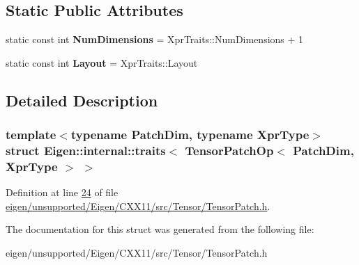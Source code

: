 \subsection*{Static Public Attributes}
\begin{DoxyCompactItemize}
\item 
\mbox{\label{struct_eigen_1_1internal_1_1traits_3_01_tensor_patch_op_3_01_patch_dim_00_01_xpr_type_01_4_01_4_a271eeecc752081f39f0ac5aaec71452e}} 
static const int {\bfseries Num\+Dimensions} = Xpr\+Traits\+::\+Num\+Dimensions + 1
\item 
\mbox{\label{struct_eigen_1_1internal_1_1traits_3_01_tensor_patch_op_3_01_patch_dim_00_01_xpr_type_01_4_01_4_ad5979fe3bd472b1ab35aa66724ec6a7a}} 
static const int {\bfseries Layout} = Xpr\+Traits\+::\+Layout
\end{DoxyCompactItemize}


\subsection{Detailed Description}
\subsubsection*{template$<$typename Patch\+Dim, typename Xpr\+Type$>$\newline
struct Eigen\+::internal\+::traits$<$ Tensor\+Patch\+Op$<$ Patch\+Dim, Xpr\+Type $>$ $>$}



Definition at line \hyperlink{eigen_2unsupported_2_eigen_2_c_x_x11_2src_2_tensor_2_tensor_patch_8h_source_l00024}{24} of file \hyperlink{eigen_2unsupported_2_eigen_2_c_x_x11_2src_2_tensor_2_tensor_patch_8h_source}{eigen/unsupported/\+Eigen/\+C\+X\+X11/src/\+Tensor/\+Tensor\+Patch.\+h}.



The documentation for this struct was generated from the following file\+:\begin{DoxyCompactItemize}
\item 
eigen/unsupported/\+Eigen/\+C\+X\+X11/src/\+Tensor/\+Tensor\+Patch.\+h\end{DoxyCompactItemize}
